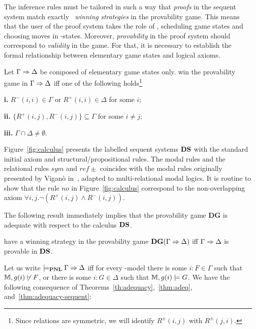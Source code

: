 The inference rules must be tailored in such a way that {\em
proofs} in the sequent system match exactly \My\  {\em winning strategies} in
the provability game. This means that the user of the proof system takes the
role of \Me, scheduling game states and choosing moves in \I-states. 
Moreover, {\em provability} in the proof system should correspond to {\em
validity} in the game. For that,  it is necessary to establish the
formal relationship between elementary game states and logical axioms.


\begin{lemma}\label{lemma:init}
    Let $\Gamma\Rightarrow \Delta$ be composed of elementary game states only. \Ic win the provability game in $\Gamma \Rightarrow \Delta$ iff one of the following holds\footnote{\label{foot:sym}Since relations are symmetric, we will identify $R^\pm(i,j)$ with  $R^\pm(j,i)$.} 
    
    \noindent\textbf{i.} $R^-(i,i)\in\Gamma$ or $R^+(i,i)\in\Delta$ for some $i$;

    \noindent\textbf{ii.} $\{R^+(i,j),R^-(i,j)\}\subseteq\Gamma$ for some $i\not=j$;

    \noindent\textbf{iii.} $\Gamma\cap\Delta\not=\emptyset$.
\end{lemma}
Figure~\ref{fig:calculus} presents the labelled sequent systems $\mathbf{DS}$ with the standard initial axiom and structural/propositional  rules. The modal  rules and the relational rules $sym$ and  $ref\pm$  coincides with the modal rules originally presented by Vigan\`{o} in~\cite{Vigano:2000}, adapted to multi-relational modal logics. 
%
It is routine to show that the rule $no$ in Figure~\ref{fig:calculus} correspond to the non-overlapping  axiom
$
\forall i,j. \neg(R^+(i,j)\wedge R^-(i,j)) 
$.

The following result immediately implies that the provability game $\mathbf{DG}$ is adequate with respect to the calculus $\mathbf{DS}$.

\begin{theorem}\label{thm:adequacy-sequent}
\Ic have a winning strategy in the provability game $\mathbf{DG}(\Gamma\Rightarrow\Delta)$  iff $\Gamma\Rightarrow\Delta$ is provable in $\mathbf{DS}$. 
\end{theorem}

Let us write $\models_{\textbf{PNL}} \Gamma \Rightarrow \Delta$ iff for every \PNL-model there is some $i:F \in \Gamma$ such that $\M,\g(i)\not\vdash F$, or there is some $i:G \in \Delta$ such that $\M,\g(i)\models G$. We have the following consequence of Theorems~\ref{th:adequacy},~\ref{thm:adeq}, and~\ref{thm:adequacy-sequent}: 

